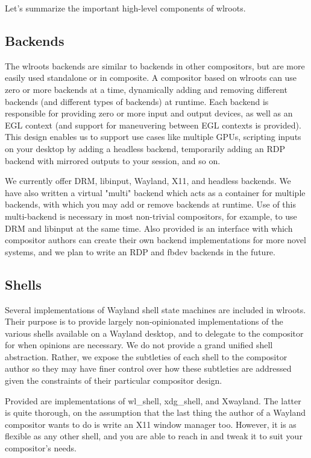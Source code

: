 \documentclass{article}
\begin{document}
Let's summarize the important high-level components of wlroots.

\subsection{Backends}

The wlroots backends are similar to backends in other compositors, but are more
easily used standalone or in composite. A compositor based on wlroots can use
zero or more backends at a time, dynamically adding and removing different
backends (and different types of backends) at runtime. Each backend is
responsible for providing zero or more input and output devices, as well as an
EGL context (and support for maneuvering between EGL contexts is provided). This
design enables us to support use cases like multiple GPUs, scripting inputs on
your desktop by adding a headless backend, temporarily adding an RDP backend
with mirrored outputs to your session, and so on.

We currently offer DRM, libinput, Wayland, X11, and headless backends. We have
also written a virtual "multi" backend which acts as a container for multiple
backends, with which you may add or remove backends at runtime. Use of this
multi-backend is necessary in most non-trivial compositors, for example, to use
DRM and libinput at the same time. Also provided is an interface with which
compositor authors can create their own backend implementations for more novel
systems, and we plan to write an RDP and fbdev backends in the future.

\subsection{Shells}

Several implementations of Wayland shell state machines are included in wlroots.
Their purpose is to provide largely non-opinionated implementations of the
various shells available on a Wayland desktop, and to delegate to the compositor
for when opinions are necessary. We do not provide a grand unified shell
abstraction. Rather, we expose the subtleties of each shell to the compositor
author so they may have finer control over how these subtleties are addressed
given the constraints of their particular compositor design.

Provided are implementations of wl_shell, xdg_shell, and Xwayland. The latter is
quite thorough, on the assumption that the last thing the author of a Wayland
compositor wants to do is write an X11 window manager too. However, it is as
flexible as any other shell, and you are able to reach in and tweak it to suit
your compositor's needs.
\end{document}

